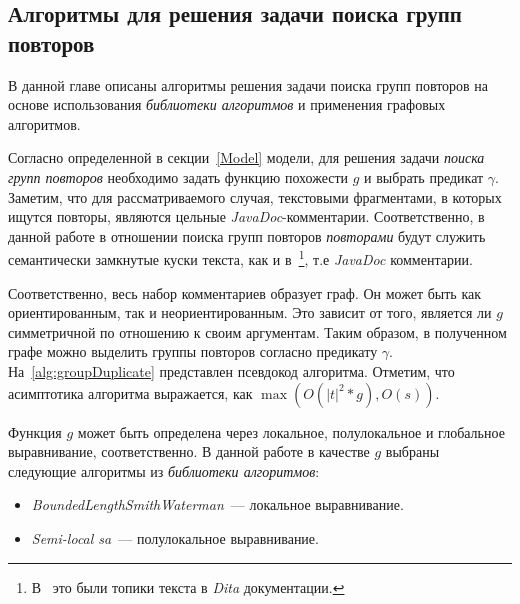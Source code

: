 



\subsection{Алгоритмы для решения задачи поиска групп повторов}\label{grouppa}
В данной главе описаны алгоритмы решения задачи поиска групп повторов на основе использования \emph{библиотеки алгоритмов} и применения графовых алгоритмов.

Согласно определенной в секции~\ref{Model} модели, для решения задачи \emph{поиска групп повторов}  необходимо
задать функцию похожести $g$ и выбрать предикат $\gamma$.
Заметим, что для рассматриваемого случая, текстовыми фрагментами, в которых ищутся повторы, являются цельные \emph{JavaDoc}-комментарии.
Соответственно, в данной работе в отношении поиска групп повторов \emph{повторами} будут служить семантически замкнутые куски текста, как и в~\cite{soto2015similarity}\footnote{В~\cite{soto2015similarity} это были топики текста в \emph{Dita} документации.}, т.е \emph{JavaDoc} комментарии.

Соответственно, весь набор комментариев образует граф.
Он может быть как ориентированным, так и неориентированным.
Это зависит  от того, является ли $g$ симметричной по отношению к своим аргументам.
Таким образом, в полученном графе можно выделить группы повторов согласно предикату $\gamma$.
На~\ref{alg:groupDuplicate} представлен псевдокод алгоритма.
Отметим, что асимптотика алгоритма выражается, как $\max (O(|t|^2*g), O(s))$.

Функция $g$ может быть определена через локальное, полулокальное и глобальное выравнивание, соответственно.
В данной работе в качестве $g$ выбраны следующие алгоритмы из \emph{библиотеки алгоритмов}:
\begin{itemize}
    \item \emph{BoundedLengthSmithWaterman}~--- локальное выравнивание.
    \item \emph{Semi-local sa}~--- полулокальное выравнивание.
\end{itemize}

